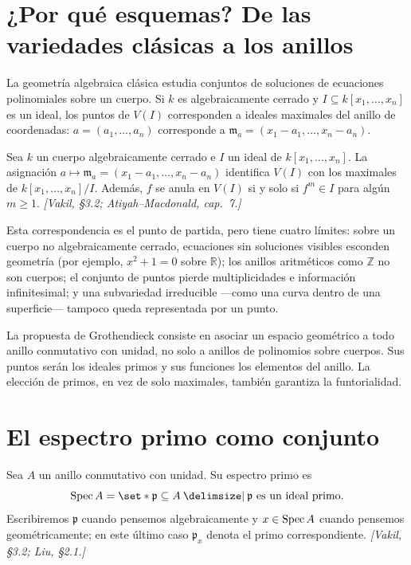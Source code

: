 \section{¿Por qué esquemas? De las variedades clásicas a los anillos}

La geometría algebraica clásica estudia conjuntos de soluciones de ecuaciones polinomiales sobre un cuerpo. Si $k$ es algebraicamente cerrado y $I\subseteq k[x_1,\ldots,x_n]$ es un ideal, los puntos de $V(I)$ corresponden a ideales maximales del anillo de coordenadas: $a=(a_1,\ldots,a_n)$ corresponde a $\mathfrak m_a=(x_1-a_1,\ldots,x_n-a_n)$.

\begin{teo}
\label{teo:s01-nullstellensatz-hilbert-enunciado}
Sea $k$ un cuerpo algebraicamente cerrado e $I$ un ideal de $k[x_1,\ldots,x_n]$. La asignación $a\mapsto\mathfrak m_a=(x_1-a_1,\ldots,x_n-a_n)$ identifica $V(I)$ con los maximales de $k[x_1,\ldots,x_n]/I$. Además, $f$ se anula en $V(I)$ si y solo si $f^m\in I$ para algún $m\ge1$. \emph{[Vakil, \S3.2; Atiyah--Macdonald, cap.~7.]}
\end{teo}

Esta correspondencia es el punto de partida, pero tiene cuatro límites: sobre un cuerpo no algebraicamente cerrado, ecuaciones sin soluciones visibles esconden geometría (por ejemplo, $x^2+1=0$ sobre $\mathbb R$); los anillos aritméticos como $\mathbb Z$ no son cuerpos; el conjunto de puntos pierde multiplicidades e información infinitesimal; y una subvariedad irreducible —como una curva dentro de una superficie— tampoco queda representada por un punto.

La propuesta de Grothendieck consiste en asociar un espacio geométrico a todo anillo conmutativo con unidad, no solo a anillos de polinomios sobre cuerpos. Sus puntos serán los ideales primos y sus funciones los elementos del anillo. La elección de primos, en vez de solo maximales, también garantiza la funtorialidad.

\section{El espectro primo como conjunto}

\begin{defi}
\label{defi:s01-espectro-primo}
Sea $A$ un anillo conmutativo con unidad. Su espectro primo es
\[
\Spec A=\set*{\mathfrak p\subseteq A \given \mathfrak p\text{ es un ideal primo}}.
\]
Escribiremos $\mathfrak p$ cuando pensemos algebraicamente y $x\in\operatorname{Spec} A$ cuando pensemos geométricamente; en este último caso $\mathfrak p_x$ denota el primo correspondiente. \emph{[Vakil, \S3.2; Liu, \S2.1.]}
\end{defi}


